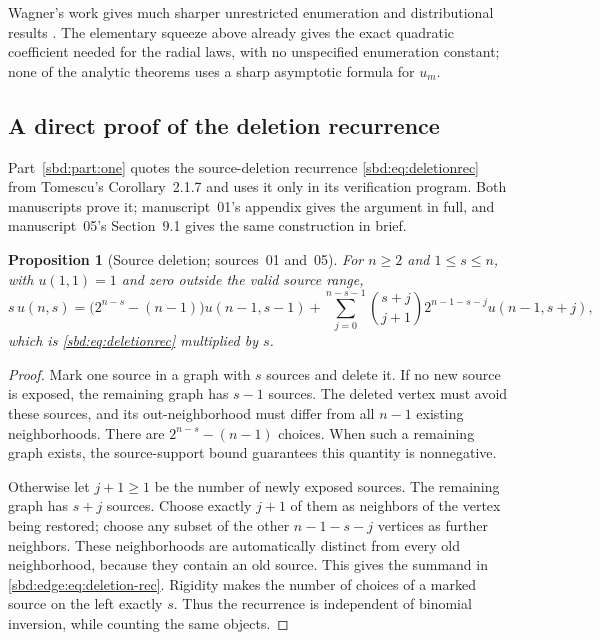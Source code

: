 \documentclass[11pt,a4paper]{article}
\newtheorem{proposition}[theorem]{Proposition}
\theoremstyle{definition}
\begin{document}
Wagner's work gives much sharper unrestricted enumeration and
distributional results \cite{wagner,wagner13}. The elementary squeeze above
already gives the exact quadratic coefficient needed for the radial laws,
with no unspecified enumeration constant; none of the analytic theorems
uses a sharp asymptotic formula for $u_m$.

\subsection{A direct proof of the deletion recurrence}
Part~\ref{sbd:part:one} quotes the source-deletion recurrence
\eqref{sbd:eq:deletionrec} from Tomescu's Corollary~2.1.7 \cite{tomescu}
and uses it only in its verification program. Both manuscripts prove it;
manuscript~01's appendix gives the argument in full, and manuscript~05's
Section~9.1 gives the same construction in brief.

\begin{proposition}[Source deletion; sources~01 and~05]\label{sbd:edge:prop:deletion}
For $n\ge2$ and $1\le s\le n$, with $u(1,1)=1$ and zero outside the valid
source range,
\begin{equation}\label{sbd:edge:eq:deletion-rec}
 s\,u(n,s)
 =\bigl(2^{n-s}-(n-1)\bigr)u(n-1,s-1)
 +\sum_{j=0}^{n-s-1}
 \binom{s+j}{j+1}2^{n-1-s-j}u(n-1,s+j),
\end{equation}
which is \eqref{sbd:eq:deletionrec} multiplied by $s$.
\end{proposition}
\begin{proof}
Mark one source in a graph with $s$ sources and delete it. If no new
source is exposed, the remaining graph has $s-1$ sources. The deleted
vertex must avoid these sources, and its out-neighborhood must differ from
all $n-1$ existing neighborhoods. There are $2^{n-s}-(n-1)$ choices. When
such a remaining graph exists, the source-support bound guarantees this
quantity is nonnegative.

Otherwise let $j+1\ge1$ be the number of newly exposed sources. The
remaining graph has $s+j$ sources. Choose exactly $j+1$ of them as
neighbors of the vertex being restored; choose any subset of the other
$n-1-s-j$ vertices as further neighbors. These neighborhoods are
automatically distinct from every old neighborhood, because they contain
an old source. This gives the summand in \eqref{sbd:edge:eq:deletion-rec}.
Rigidity makes the number of choices of a marked source on the left
exactly $s$. Thus the recurrence is independent of binomial inversion,
while counting the same objects.
\end{proof}
\end{document}
